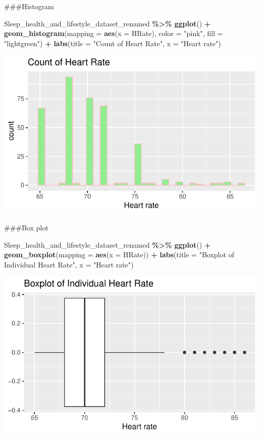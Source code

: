 \documentclass[
  11pt,
]{article}
\newenvironment{Shaded}{\begin{snugshade}}{\end{snugshade}}
\newcommand{\AttributeTok}[1]{\textcolor[rgb]{0.13,0.29,0.53}{#1}}
\newcommand{\FunctionTok}[1]{\textcolor[rgb]{0.13,0.29,0.53}{\textbf{#1}}}
\newcommand{\NormalTok}[1]{#1}
\newcommand{\SpecialCharTok}[1]{\textcolor[rgb]{0.81,0.36,0.00}{\textbf{#1}}}
\newcommand{\StringTok}[1]{\textcolor[rgb]{0.31,0.60,0.02}{#1}}
\begin{document}
\#\#\#Histogram

\begin{Shaded}
\begin{Highlighting}[]
\NormalTok{Sleep\_health\_and\_lifestyle\_dataset\_renamed }\SpecialCharTok{\%\textgreater{}\%}
  \FunctionTok{ggplot}\NormalTok{() }\SpecialCharTok{+}
    \FunctionTok{geom\_histogram}\NormalTok{(}\AttributeTok{mapping =} \FunctionTok{aes}\NormalTok{(}\AttributeTok{x =}\NormalTok{ HRate), }\AttributeTok{color =} \StringTok{"pink"}\NormalTok{, }\AttributeTok{fill =} \StringTok{"lightgreen"}\NormalTok{) }\SpecialCharTok{+}
    \FunctionTok{labs}\NormalTok{(}\AttributeTok{title =} \StringTok{"Count of Heart Rate"}\NormalTok{, }\AttributeTok{x =} \StringTok{"Heart rate"}\NormalTok{) }
\end{Highlighting}
\end{Shaded}

\begin{center}\includegraphics[width=0.7\linewidth]{SleepHelath_files/figure-latex/unnamed-chunk-39-1} \end{center}

\#\#\#Box plot

\begin{Shaded}
\begin{Highlighting}[]
\NormalTok{Sleep\_health\_and\_lifestyle\_dataset\_renamed }\SpecialCharTok{\%\textgreater{}\%}
  \FunctionTok{ggplot}\NormalTok{() }\SpecialCharTok{+}
    \FunctionTok{geom\_boxplot}\NormalTok{(}\AttributeTok{mapping =} \FunctionTok{aes}\NormalTok{(}\AttributeTok{x =}\NormalTok{ HRate)) }\SpecialCharTok{+}
    \FunctionTok{labs}\NormalTok{(}\AttributeTok{title =} \StringTok{"Boxplot of Individual Heart Rate"}\NormalTok{, }\AttributeTok{x =} \StringTok{"Heart rate"}\NormalTok{)}
\end{Highlighting}
\end{Shaded}

\begin{center}\includegraphics[width=0.7\linewidth]{SleepHelath_files/figure-latex/unnamed-chunk-40-1} \end{center}
\end{document}
